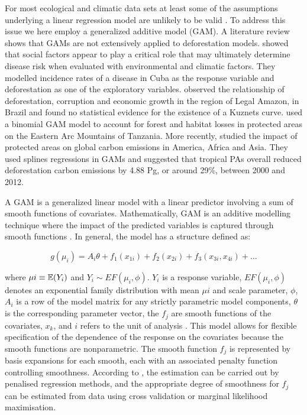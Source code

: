For most ecological and climatic data sets at least some of the assumptions underlying a linear regression model are unlikely to be valid \citep{zuur_2011}.   To address this issue we here employ a generalized additive model (GAM). A literature review shows that GAMs are not extensively applied to deforestation models. \citet{COHEN_2008} showed that social factors appear to play a critical role that may ultimately determine disease risk when evaluated with environmental and climatic factors. They modelled incidence rates of a disease in Cuba as the response variable and deforestation as one of the exploratory variables. \citet{MENDES_2012} observed the relationship of deforestation, corruption and economic growth in the region of Legal Amazon, in Brazil and found no statistical evidence for the existence of a Kuznets curve. \citet{GREEN_2013} used a binomial GAM model to account for forest and habitat losses in protected areas on the Eastern Arc Mountains of Tanzania. More recently, \citet{BEBBER_2017} studied the impact of protected areas on global carbon emissions in America, Africa and Asia. They used splines regressions in GAMs and suggested that tropical PAs overall reduced deforestation carbon emissions by 4.88 Pg, or around 29\%, between 2000 and 2012. 


A GAM is a generalized linear model with a linear predictor involving a sum of smooth functions of covariates. Mathematically, GAM is an additive modelling technique where the impact of the predicted variables is captured through smooth functions \citep{larsen_2015}. In general, the model has a structure defined as: 

\begin{equation}  \label{eq:3.2} 
g(\mu_{i}) = A_{i} \theta + f_{1}(x_{1i}) + f_{2}(x_{2i}) + f_{3}(x_{3i},x_{4i}) + \dots
\end{equation}

where $\mu{i} \equiv \displaystyle \operatorname{\mathbb{E}}(Y_{i})$ and $Y_{i} \sim EF(\mu_{i},\phi)$. $Y_{i}$ is a response variable, $EF(\mu_{i},\phi)$ denotes an exponential family distribution with mean $\mu{i}$ and scale parameter, $\phi$, $ A_{i}$ is a row of the model matrix for any strictly parametric model components, $\theta$ is the corresponding parameter vector, the $f_{j}$ are smooth functions of the covariates, $x_{k}$, and ${i}$ refers to the unit of analysis \citep{Wood_2017}. This model allows for flexible specification of the dependence of the response on the covariates because the smooth functions are nonparametric. The smooth function $f_{j}$ is represented by basis expansions for each smooth, each with an associated penalty function controlling  smoothness. According to \citet{Wood_2004, Wood_2017}, the estimation can be carried out by penalised regression methods, and the appropriate degree of smoothness for $f_{j}$ can be estimated from data using cross validation or marginal likelihood maximisation.

